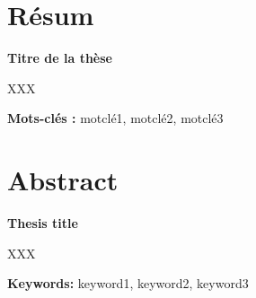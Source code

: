 

\section*{Résum}

{\large\bf\noindent Titre de la thèse}

\bigskip

XXX

\bigskip

\textbf{Mots-clés :} motclé1, motclé2, motclé3

\vfill



\section*{Abstract}

{\large\bf\noindent Thesis title}

\bigskip

XXX

\bigskip

\textbf{Keywords:} keyword1, keyword2, keyword3

